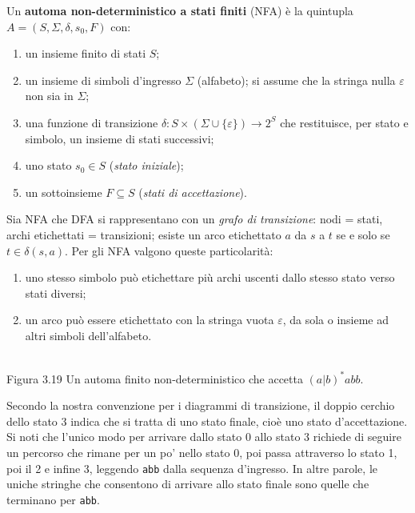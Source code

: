 Un \textbf{automa non-deterministico a stati finiti} (NFA) è la quintupla
\(A=(S,\Sigma,\delta,s_0,F)\) con:
\begin{enumerate}
  \item un insieme finito di stati \(S\);
  \item un insieme di simboli d'ingresso \(\Sigma\) (alfabeto); si assume che la stringa nulla \(\varepsilon\) non sia in \(\Sigma\);
  \item una funzione di transizione \(\delta : S \times (\Sigma \cup \{\varepsilon\}) \to 2^{S}\) che restituisce, per stato e simbolo, un insieme di stati successivi;
  \item uno stato \(s_0 \in S\) (\emph{stato iniziale});
  \item un sottoinsieme \(F \subseteq S\) (\emph{stati di accettazione}).
\end{enumerate}
\vspace{16pt}
Sia NFA che DFA si rappresentano con un \emph{grafo di transizione}: nodi = stati, archi etichettati = transizioni; esiste un arco etichettato \(a\) da \(s\) a \(t\) se e solo se \(t \in \delta(s,a)\).
Per gli NFA valgono queste particolarità:
\begin{enumerate}
  \item uno stesso simbolo può etichettare più archi uscenti dallo stesso stato verso stati diversi;
  \item un arco può essere etichettato con la stringa vuota \(\varepsilon\), da sola o insieme ad altri simboli dell’alfabeto.
\end{enumerate}

\begin{center}
    \\
    \footnotesize Figura 3.19 \quad Un automa finito non-deterministico che accetta \((a|b)^*abb\).
    \end{center}
    
    Secondo la nostra convenzione per i diagrammi di transizione, il doppio cerchio dello stato 3 indica che si tratta di uno stato finale, cioè uno stato d'accettazione. Si noti che l'unico modo per arrivare dallo stato 0 allo stato 3 richiede di seguire un percorso che rimane per un po' nello stato 0, poi passa attraverso lo stato 1, poi il 2 e infine 3, leggendo \texttt{abb} dalla sequenza d'ingresso. In altre parole, le uniche stringhe che consentono di arrivare allo stato finale sono quelle che terminano per \texttt{abb}.
    
